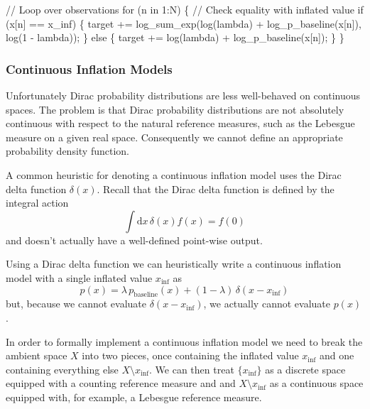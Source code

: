 \documentclass[
  letterpaper,
  DIV=11,
  numbers=noendperiod]{scrartcl}
\newenvironment{Shaded}{\begin{snugshade}}{\end{snugshade}}
\newcommand{\CommentTok}[1]{\textcolor[rgb]{0.37,0.37,0.37}{#1}}
\newcommand{\ControlFlowTok}[1]{\textcolor[rgb]{0.00,0.23,0.31}{#1}}
\newcommand{\DecValTok}[1]{\textcolor[rgb]{0.68,0.00,0.00}{#1}}
\newcommand{\KeywordTok}[1]{\textcolor[rgb]{0.00,0.23,0.31}{#1}}
\newcommand{\NormalTok}[1]{\textcolor[rgb]{0.00,0.23,0.31}{#1}}
\begin{document}
\begin{Shaded}
\begin{Highlighting}[]
\CommentTok{// Loop over observations}
\ControlFlowTok{for}\NormalTok{ (n }\ControlFlowTok{in} \DecValTok{1}\NormalTok{:N) \{}
  \CommentTok{// Check equality with inflated value}
  \ControlFlowTok{if}\NormalTok{ (x[n] == x\_inf) \{}
    \KeywordTok{target +=}\NormalTok{ log\_sum\_exp(log(lambda) + log\_p\_baseline(x[n]),}
\NormalTok{                          log(}\DecValTok{1}\NormalTok{ {-} lambda));}
\NormalTok{  \} }\ControlFlowTok{else}\NormalTok{ \{}
    \KeywordTok{target +=}\NormalTok{ log(lambda) + log\_p\_baseline(x[n]);}
\NormalTok{  \}}
\NormalTok{\}}
\end{Highlighting}
\end{Shaded}

\subsubsection{Continuous Inflation Models}\label{sec:cont_infl}

Unfortunately Dirac probability distributions are less well-behaved on
continuous spaces. The problem is that Dirac probability distributions
are not absolutely continuous with respect to the natural reference
measures, such as the Lebesgue measure on a given real space.
Consequently we cannot define an appropriate probability density
function.

A common heuristic for denoting a continuous inflation model uses the
Dirac delta function \(\delta(x)\). Recall that the Dirac delta function
is defined by the integral action \[
\int \mathrm{d} x \, \delta(x) f(x) = f(0)
\] and doesn't actually have a well-defined point-wise output.

Using a Dirac delta function we can heuristically write a continuous
inflation model with a single inflated value \(x_{\mathrm{inf}}\) as \[
p(x)
=
  \lambda       \, p_{\mathrm{baseline}}(x)
+ (1 - \lambda) \, \delta(x - x_{\mathrm{inf}})
\] but, because we cannot evaluate \(\delta(x - x_{\mathrm{inf}})\), we
actually cannot evaluate \(p(x)\).

In order to formally implement a continuous inflation model we need to
break the ambient space \(X\) into two pieces, once containing the
inflated value \(x_{\mathrm{inf}}\) and one containing everything else
\(X \setminus x_{\mathrm{inf}}\). We can then treat
\(\{ x_{\mathrm{inf}}\}\) as a discrete space equipped with a counting
reference measure and and \(X \setminus x_{\mathrm{inf}}\) as a
continuous space equipped with, for example, a Lebesgue reference
measure.
\end{document}
